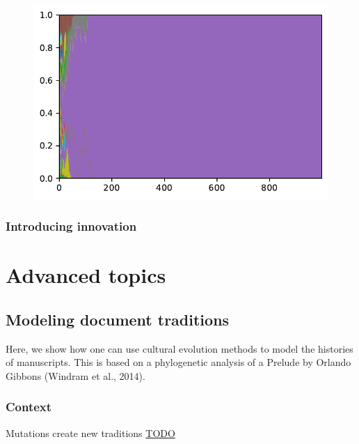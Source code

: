 \documentclass[
  a4paperpaper,
  ,captions=tableheading
]{scrbook}
\begin{document}
\begin{figure}[H]

{\centering \includegraphics{chapter09_files/figure-pdf/cell-7-output-1.pdf}

}

\end{figure}

\hypertarget{introducing-innovation}{%
\section{Introducing innovation}\label{introducing-innovation}}

\part{Advanced topics}

\hypertarget{modeling-document-traditions}{%
\chapter{Modeling document
traditions}\label{modeling-document-traditions}}

Here, we show how one can use cultural evolution methods to model the
histories of manuscripts. This is based on a phylogenetic analysis of a
Prelude by Orlando Gibbons (Windram et al., 2014).

\hypertarget{context}{%
\section{Context}\label{context}}

Mutations create new traditions \protect\hyperlink{todo}{TODO}
\end{document}
